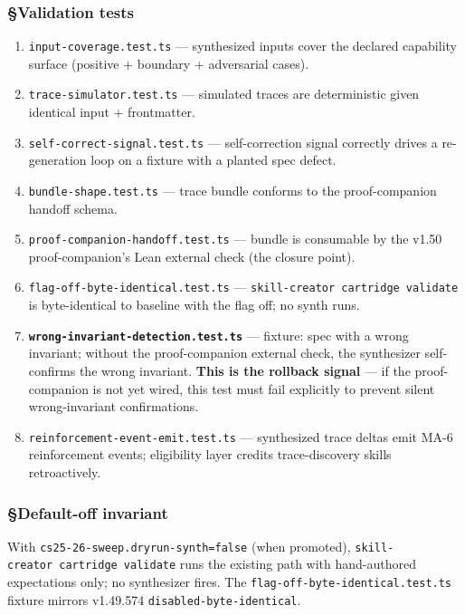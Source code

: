 \documentclass[11pt,letterpaper]{article}
\providecommand{\tightlist}{\setlength{\itemsep}{0pt}\setlength{\parskip}{0pt}}
\begin{document}
\subsubsection{§Validation tests}

\begin{enumerate}
\def\labelenumi{\arabic{enumi}.}
\tightlist
\item
  \texttt{input-coverage.test.ts} --- synthesized inputs cover the
  declared capability surface (positive + boundary + adversarial cases).
\item
  \texttt{trace-simulator.test.ts} --- simulated traces are
  deterministic given identical input + frontmatter.
\item
  \texttt{self-correct-signal.test.ts} --- self-correction signal
  correctly drives a re-generation loop on a fixture with a planted spec
  defect.
\item
  \texttt{bundle-shape.test.ts} --- trace bundle conforms to the
  proof-companion handoff schema.
\item
  \texttt{proof-companion-handoff.test.ts} --- bundle is consumable by
  the v1.50 proof-companion's Lean external check (the closure point).
\item
  \texttt{flag-off-byte-identical.test.ts} ---
  \texttt{skill-creator\ cartridge\ validate} is byte-identical to
  baseline with the flag off; no synth runs.
\item
  \textbf{\texttt{wrong-invariant-detection.test.ts}} --- fixture: spec
  with a wrong invariant; without the proof-companion external check,
  the synthesizer self-confirms the wrong invariant. \textbf{This is the
  rollback signal} --- if the proof-companion is not yet wired, this
  test must fail explicitly to prevent silent wrong-invariant
  confirmations.
\item
  \texttt{reinforcement-event-emit.test.ts} --- synthesized trace deltas
  emit MA-6 reinforcement events; eligibility layer credits
  trace-discovery skills retroactively.
\end{enumerate}

\subsubsection{§Default-off invariant}

With \texttt{cs25-26-sweep.dryrun-synth=false} (when promoted),
\texttt{skill-creator\ cartridge\ validate} runs the existing path with
hand-authored expectations only; no synthesizer fires. The
\texttt{flag-off-byte-identical.test.ts} fixture mirrors v1.49.574
\texttt{disabled-byte-identical}.
\end{document}
